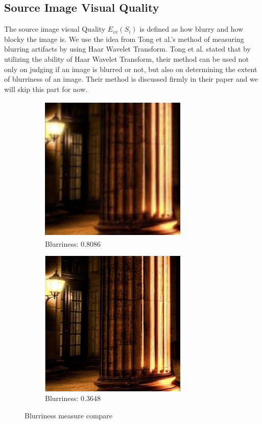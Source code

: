 \documentclass[12pt]{article}
\begin{document}
\subsection{Source Image Visual Quality}
The source image visual Quality $\mathit{E_{vv}(S_i)}$ is defined as how blurry and how blocky the image is. We use the idea from Tong et al.'s \cite{Tong} method of measuring blurring artifacts by using Haar Wavelet Transform. Tong et al. stated that by utilizing the ability of Haar Wavelet Transform, their method can be used not only on judging if an image is blurred or not, but also on determining the extent of blurriness of an image. Their method is discussed firmly in their paper and we will skip this part for now.
\begin{figure}[htbp]
	\begin{subfigure}[b]{0.49 \textwidth}
	\centering
	\includegraphics[width=7cm, height=7cm]{a}
	\caption{Blurriness: 0.8086}
	\label{default}
	\end{subfigure}
	\hspace{1cm}
	\begin{subfigure}[b]{0.49 \textwidth}
	\centering
	\includegraphics[width=7cm, height=7cm]{b}
	\caption{Blurriness: 0.3648}
	\label{default}
	\end{subfigure}
\caption{Blurriness measure compare}
\end{figure}
\end{document}

